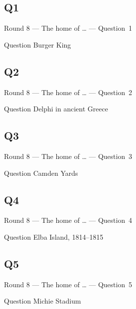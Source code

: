 \documentclass[11pt]{beamer}
\begin{document}
\subsection*{Q1}
\begin{frame}[t]{Round 8 --- The home of \ldots{} --- \mbox{Question 1}}
\vspace{-0.5em}
\begin{block}{Question}
Burger King
\end{block}
\end{frame}
\subsection*{Q2}
\begin{frame}[t]{Round 8 --- The home of \ldots{} --- \mbox{Question 2}}
\vspace{-0.5em}
\begin{block}{Question}
Delphi in ancient Greece
\end{block}
\end{frame}
\subsection*{Q3}
\begin{frame}[t]{Round 8 --- The home of \ldots{} --- \mbox{Question 3}}
\vspace{-0.5em}
\begin{block}{Question}
Camden Yards
\end{block}
\end{frame}
\subsection*{Q4}
\begin{frame}[t]{Round 8 --- The home of \ldots{} --- \mbox{Question 4}}
\vspace{-0.5em}
\begin{block}{Question}
Elba Island, 1814--1815
\end{block}
\end{frame}
\subsection*{Q5}
\begin{frame}[t]{Round 8 --- The home of \ldots{} --- \mbox{Question 5}}
\vspace{-0.5em}
\begin{block}{Question}
Michie Stadium
\end{block}
\end{frame}
\end{document}

